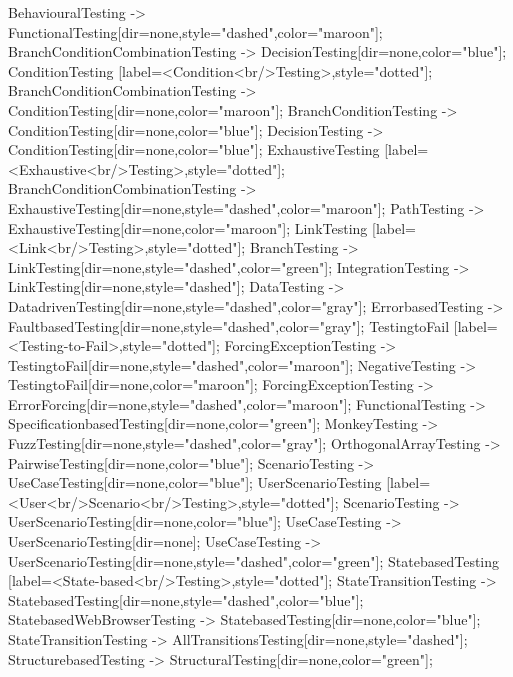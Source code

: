 \documentclass{article}
\begin{document}
{BehaviouralTesting -> FunctionalTesting[dir=none,style="dashed",color="maroon"];
BranchConditionCombinationTesting -> DecisionTesting[dir=none,color="blue"];
ConditionTesting [label=<Condition<br/>Testing>,style="dotted"];
BranchConditionCombinationTesting -> ConditionTesting[dir=none,color="maroon"];
BranchConditionTesting -> ConditionTesting[dir=none,color="blue"];
DecisionTesting -> ConditionTesting[dir=none,color="blue"];
ExhaustiveTesting [label=<Exhaustive<br/>Testing>,style="dotted"];
BranchConditionCombinationTesting -> ExhaustiveTesting[dir=none,style="dashed",color="maroon"];
PathTesting -> ExhaustiveTesting[dir=none,color="maroon"];
LinkTesting [label=<Link<br/>Testing>,style="dotted"];
BranchTesting -> LinkTesting[dir=none,style="dashed",color="green"];
IntegrationTesting -> LinkTesting[dir=none,style="dashed"];
DataTesting -> DatadrivenTesting[dir=none,style="dashed",color="gray"];
ErrorbasedTesting -> FaultbasedTesting[dir=none,style="dashed",color="gray"];
TestingtoFail [label=<Testing-to-Fail>,style="dotted"];
ForcingExceptionTesting -> TestingtoFail[dir=none,style="dashed",color="maroon"];
NegativeTesting -> TestingtoFail[dir=none,color="maroon"];
ForcingExceptionTesting -> ErrorForcing[dir=none,style="dashed",color="maroon"];
FunctionalTesting -> SpecificationbasedTesting[dir=none,color="green"];
MonkeyTesting -> FuzzTesting[dir=none,style="dashed",color="gray"];
OrthogonalArrayTesting -> PairwiseTesting[dir=none,color="blue"];
ScenarioTesting -> UseCaseTesting[dir=none,color="blue"];
UserScenarioTesting [label=<User<br/>Scenario<br/>Testing>,style="dotted"];
ScenarioTesting -> UserScenarioTesting[dir=none,color="blue"];
UseCaseTesting -> UserScenarioTesting[dir=none];
UseCaseTesting -> UserScenarioTesting[dir=none,style="dashed",color="green"];
StatebasedTesting [label=<State-based<br/>Testing>,style="dotted"];
StateTransitionTesting -> StatebasedTesting[dir=none,style="dashed",color="blue"];
StatebasedWebBrowserTesting -> StatebasedTesting[dir=none,color="blue"];
StateTransitionTesting -> AllTransitionsTesting[dir=none,style="dashed"];
StructurebasedTesting -> StructuralTesting[dir=none,color="green"];

}
\end{document}
